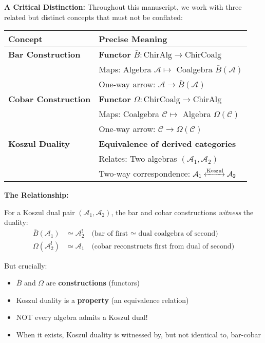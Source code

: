 \begin{remark}\label{rem:bar-cobar-koszul-distinction}
\textbf{A Critical Distinction:} Throughout this manuscript, we work with three related but distinct concepts that must not be conflated:

\begin{center}
\begin{tabular}{|l|p{10cm}|}
\hline
\textbf{Concept} & \textbf{Precise Meaning} \\
\hline
\textbf{Bar Construction} & \textbf{Functor} $\bar{B}: \text{ChirAlg} \to \text{ChirCoalg}$ \\
 & Maps: Algebra $\mathcal{A} \mapsto$ Coalgebra $\bar{B}(\mathcal{A})$ \\
 & One-way arrow: $\mathcal{A} \to \bar{B}(\mathcal{A})$ \\
\hline
\textbf{Cobar Construction} & \textbf{Functor} $\Omega: \text{ChirCoalg} \to \text{ChirAlg}$ \\
 & Maps: Coalgebra $\mathcal{C} \mapsto$ Algebra $\Omega(\mathcal{C})$ \\
 & One-way arrow: $\mathcal{C} \to \Omega(\mathcal{C})$ \\
\hline
\textbf{Koszul Duality} & \textbf{Equivalence of derived categories} \\
 & Relates: Two algebras $(\mathcal{A}_1, \mathcal{A}_2)$ \\
 & Two-way correspondence: $\mathcal{A}_1 \xleftrightarrow{\text{Koszul}} \mathcal{A}_2$ \\
\hline
\end{tabular}
\end{center}

\textbf{The Relationship:}

For a Koszul dual pair $(\mathcal{A}_1, \mathcal{A}_2)$, the bar and cobar constructions \textit{witness} the duality:
\begin{align*}
\bar{B}(\mathcal{A}_1) &\simeq \mathcal{A}_2^! \quad \text{(bar of first ≃ dual coalgebra of second)} \\
\Omega(\mathcal{A}_2^!) &\simeq \mathcal{A}_1 \quad \text{(cobar reconstructs first from dual of second)}
\end{align*}

But crucially:
\begin{itemize}
\item $\bar{B}$ and $\Omega$ are \textbf{constructions} (functors)
\item Koszul duality is a \textbf{property} (an equivalence relation)
\item NOT every algebra admits a Koszul dual!
\item When it exists, Koszul duality is witnessed by, but not identical to, bar-cobar
\end{itemize}
\end{remark}


